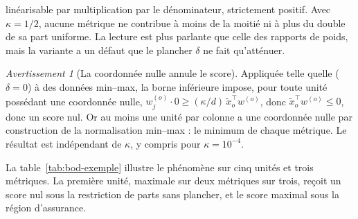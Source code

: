 \documentclass[11pt,a4paper]{article}
\theoremstyle{definition}
\theoremstyle{remark}
\newtheorem{avertissement}{Avertissement}[section]
\begin{document}
\bigskip

linéarisable par multiplication par le dénominateur, strictement positif. Avec
$\kappa = 1/2$, aucune métrique ne contribue à moins de la moitié ni à plus du double de
sa part uniforme. La lecture est plus parlante que celle des rapports de poids, mais la
variante a un défaut que le plancher $\delta$ ne fait qu'atténuer.

\medskip

\begin{avertissement}[La coordonnée nulle annule le score]
  \label{av:bod-parts}
  Appliquée telle quelle ($\delta = 0$) à des données min--max, la borne inférieure
  impose, pour toute unité possédant une coordonnée nulle,
  $w^{(o)}_j \cdot 0 \ge (\kappa/d)\,\tilde{x}_o^\top w^{(o)}$, donc
  $\tilde{x}_o^\top w^{(o)} \le 0$, donc un score nul. Or au moins une unité par colonne
  a une coordonnée nulle par construction de la normalisation min--max : le minimum de
  chaque métrique. Le résultat est indépendant de $\kappa$, y compris pour
  $\kappa = 10^{-4}$.
\end{avertissement}

\bigskip

La table~\ref{tab:bod-exemple} illustre le phénomène sur cinq unités et trois métriques.
La première unité, maximale sur deux métriques sur trois, reçoit un score nul sous la
restriction de parts sans plancher, et le score maximal sous la région d'assurance.

\medskip
\end{document}
